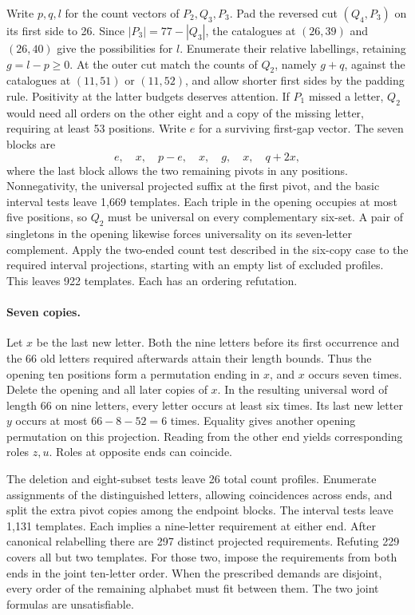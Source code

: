 \documentclass[11pt]{article}
\begin{document}
Write $p,q,l$ for the count vectors of $P_2,Q_3,P_3$. Pad the reversed cut $(Q_4,P_3)$ on its first side to 26. Since $|P_3|=77-|Q_3|$, the catalogues at $(26,39)$ and $(26,40)$ give the possibilities for $l$. Enumerate their relative labellings, retaining $g=l-p\ge0$. At the outer cut match the counts of $Q_2$, namely $g+q$, against the catalogues at $(11,51)$ or $(11,52)$, and allow shorter first sides by the padding rule. Positivity at the latter budgets deserves attention. If $P_1$ missed a letter, $Q_2$ would need all orders on the other eight and a copy of the missing letter, requiring at least 53 positions. Write $e$ for a surviving first-gap vector. The seven blocks are
\[
             e,\quad x,\quad p-e,\quad x,\quad g,\quad x,\quad q+2x ,
\]
where the last block allows the two remaining pivots in any positions. Nonnegativity, the universal projected suffix at the first pivot, and the basic interval tests leave 1,669 templates. Each triple in the opening occupies at most five positions, so $Q_2$ must be universal on every complementary six-set. A pair of singletons in the opening likewise forces universality on its seven-letter complement. Apply the two-ended count test described in the six-copy case to the required interval projections, starting with an empty list of excluded profiles. This leaves 922 templates. Each has an ordering refutation.

\paragraph{Seven copies.}
Let $x$ be the last new letter. Both the nine letters before its first occurrence and the 66 old letters required afterwards attain their length bounds. Thus the opening ten positions form a permutation ending in $x$, and $x$ occurs seven times. Delete the opening and all later copies of $x$. In the resulting universal word of length 66 on nine letters, every letter occurs at least six times. Its last new letter $y$ occurs at most $66-8-52=6$ times. Equality gives another opening permutation on this projection. Reading from the other end yields corresponding roles $z,u$. Roles at opposite ends can coincide.

The deletion and eight-subset tests leave 26 total count profiles. Enumerate assignments of the distinguished letters, allowing coincidences across ends, and split the extra pivot copies among the endpoint blocks. The interval tests leave 1,131 templates. Each implies a nine-letter requirement at either end. After canonical relabelling there are 297 distinct projected requirements. Refuting 229 covers all but two templates. For those two, impose the requirements from both ends in the joint ten-letter order. When the prescribed demands are disjoint, every order of the remaining alphabet must fit between them. The two joint formulas are unsatisfiable.
\end{document}
